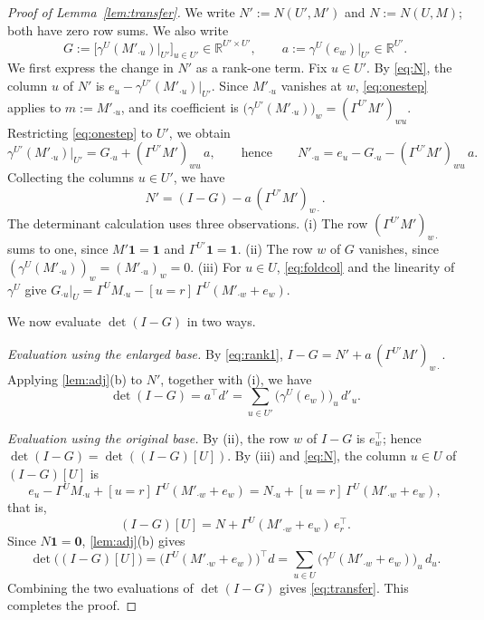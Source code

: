 \documentclass[onefignum,onetabnum,nohypdvips]{siamart250211}
\numberwithin{theorem}{section}
\numberwithin{equation}{section}
\newcommand{\R}{\mathbb{R}}
\newcommand{\one}{\mathbf{1}}
\newcommand{\zero}{\mathbf{0}}
\begin{document}
\begin{proof}[Proof of Lemma~\ref{lem:transfer}]
We write $N':=N(U',M')$ and $N:=N(U,M)$; both have zero row sums. We
also write
\[
G:=\Big[\gamma^{U}(M'_{\cdot u})\big|_{U'}\Big]_{u\in U'}\in\R^{U'\times U'},
\qquad
a:=\gamma^{U}(e_w)\big|_{U'}\in\R^{U'} .
\]
We first express the change in $N'$ as a rank-one term. Fix
$u\in U'$. By
\eqref{eq:N}, the column $u$ of $N'$ is
$e_u-\gamma^{U'}(M'_{\cdot u})\big|_{U'}$. Since $M'_{\cdot u}$
vanishes at $w$, \eqref{eq:onestep} applies to $m:=M'_{\cdot u}$, and
its coefficient is $\big(\gamma^{U'}(M'_{\cdot u})\big)_w
=(\Gamma^{U'}M')_{wu}$. Restricting \eqref{eq:onestep} to $U'$, we
obtain
\[
\gamma^{U'}(M'_{\cdot u})\big|_{U'}=G_{\cdot u}+(\Gamma^{U'}M')_{wu}\,a,
\qquad\text{hence}\qquad
N'_{\cdot u}=e_u-G_{\cdot u}-(\Gamma^{U'}M')_{wu}\,a .
\]
Collecting the columns $u\in U'$, we have
\begin{equation}\label{eq:rank1}
N'=(I-G)-a\,(\Gamma^{U'}M')_{w\cdot} .
\end{equation}
The determinant calculation uses three observations. (i) The row $(\Gamma^{U'}M')_{w\cdot}$ sums to one,
since $M'\one=\one$ and $\Gamma^{U'}\one=\one$. (ii) The row $w$ of $G$
vanishes, since $(\gamma^{U}(M'_{\cdot u}))_w=(M'_{\cdot u})_w=0$.
(iii) For $u\in U$, \eqref{eq:foldcol} and the linearity of
$\gamma^U$ give
$G_{\cdot u}|_U=\Gamma^{U}M_{\cdot u}-[u=r]\,\Gamma^{U}(M'_{\cdot w}+e_w)$.

We now evaluate $\det(I-G)$ in two ways.

\emph{Evaluation using the enlarged base.} By \eqref{eq:rank1},
$I-G=N'+a\,(\Gamma^{U'}M')_{w\cdot}$. Applying \cref{lem:adj}(b) to
$N'$, together with (i), we have
\begin{equation}\label{eq:Dleft}
\det(I-G)=a^{\top}d'=\sum_{u\in U'}\big(\gamma^{U}(e_w)\big)_u\,d'_u .
\end{equation}

\emph{Evaluation using the original base.} By (ii), the row $w$ of $I-G$ is $e_w^{\top}$;
hence $\det(I-G)=\det((I-G)[U])$. By (iii) and \eqref{eq:N}, the
column $u\in U$ of $(I-G)[U]$ is
\[
e_u-\Gamma^UM_{\cdot u}+[u=r]\,\Gamma^U(M'_{\cdot w}+e_w)
=N_{\cdot u}+[u=r]\,\Gamma^U(M'_{\cdot w}+e_w),
\]
that is,
\begin{equation}\label{eq:Dblock}
(I-G)[U]=N+\Gamma^{U}(M'_{\cdot w}+e_w)\,e_r^{\top} .
\end{equation}
Since $N\one=\zero$, \cref{lem:adj}(b) gives
\[
\det\big((I-G)[U]\big)=\big(\Gamma^{U}(M'_{\cdot w}+e_w)\big)^{\top}d
=\sum_{u\in U}\big(\gamma^{U}(M'_{\cdot w}+e_w)\big)_u\,d_u .
\]
Combining the two evaluations of $\det(I-G)$ gives \eqref{eq:transfer}.
This completes the proof.
\end{proof}
\end{document}
